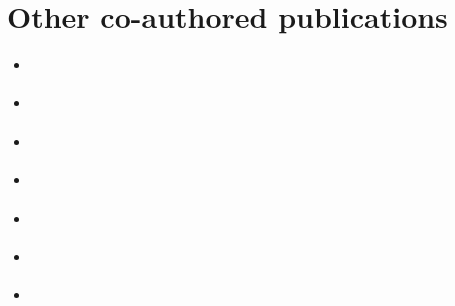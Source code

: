 \chapter{Other co-authored publications}
\label{app:other-publications}

\begin{itemize}
	\item \citet{Astrin2016}
	\item \citet{Kraaijeveld2016}
	\item \citet{Struck2014}
	\item \citet{Peters2014}
	\item \citet{Misof2014}
	\item \citet{DellAmpio2014}
	\item \citet{Niehuis2012}
\end{itemize}





\label{app:Misof2014}



